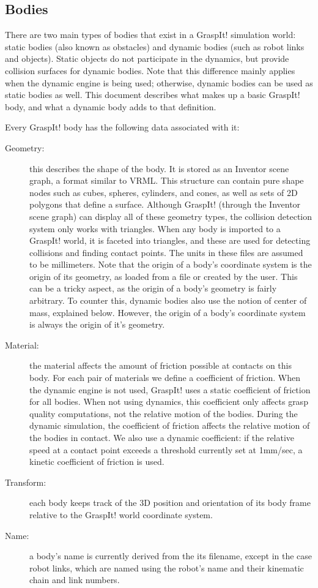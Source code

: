 \subsection{Bodies}
\label{sec:bodies}

There are two main types of bodies that exist in a GraspIt! simulation
world: static bodies (also known as obstacles) and dynamic bodies
(such as robot links and objects). Static objects do not participate
in the dynamics, but provide collision surfaces for dynamic
bodies. Note that this difference mainly applies when the dynamic
engine is being used; otherwise, dynamic bodies can be used as static
bodies as well. This document describes what makes up a basic GraspIt!
body, and what a dynamic body adds to that definition.

Every GraspIt! body has the following data associated with it:

\begin{description}
\item[Geometry:] this describes the shape of the body. It is stored as
  an Inventor scene graph, a format similar to VRML. This structure
  can contain pure shape nodes such as cubes, spheres, cylinders, and
  cones, as well as sets of 2D polygons that define a
  surface. Although GraspIt! (through the Inventor scene graph) can
  display all of these geometry types, the collision detection system
  only works with triangles. When any body is imported to a GraspIt!
  world, it is faceted into triangles, and these are used for
  detecting collisions and finding contact points. The units in these
  files are assumed to be millimeters. Note that the origin of a
  body's coordinate system is the origin of its geometry, as loaded
  from a file or created by the user. This can be a tricky aspect, as
  the origin of a body's geometry is fairly arbitrary. To counter
  this, dynamic bodies also use the notion of center of mass,
  explained below. However, the origin of a body's coordinate system
  is always the origin of it's geometry.
\item[Material:] the material affects the amount of friction possible
  at contacts on this body. For each pair of materials we define a
  coefficient of friction.  When the dynamic engine is not used,
  GraspIt! uses a static coefficient of friction for all bodies. When
  not using dynamics, this coefficient only affects grasp quality
  computations, not the relative motion of the bodies. During the
  dynamic simulation, the coefficient of friction affects the relative
  motion of the bodies in contact. We also use a dynamic coefficient:
  if the relative speed at a contact point exceeds a threshold
  currently set at 1mm/sec, a kinetic coefficient of friction is used.
\item[Transform:] each body keeps track of the 3D position and
  orientation of its body frame relative to the GraspIt! world
  coordinate system.
\item[Name:] a body's name is currently derived from the its filename,
  except in the case robot links, which are named using the robot's
  name and their kinematic chain and link numbers.
\end{description}

